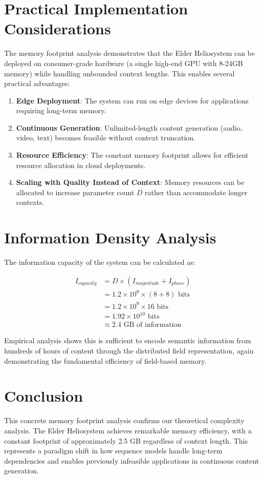 \section{Practical Implementation Considerations}

The memory footprint analysis demonstrates that the Elder Heliosystem can be deployed on consumer-grade hardware (a single high-end GPU with 8-24GB memory) while handling unbounded context lengths. This enables several practical advantages:

\begin{enumerate}
    \item \textbf{Edge Deployment}: The system can run on edge devices for applications requiring long-term memory.
    
    \item \textbf{Continuous Generation}: Unlimited-length content generation (audio, video, text) becomes feasible without context truncation.
    
    \item \textbf{Resource Efficiency}: The constant memory footprint allows for efficient resource allocation in cloud deployments.
    
    \item \textbf{Scaling with Quality Instead of Context}: Memory resources can be allocated to increase parameter count $D$ rather than accommodate longer contexts.
\end{enumerate}

\section{Information Density Analysis}

The information capacity of the system can be calculated as:

\begin{align}
I_{capacity} &= D \times (I_{magnitude} + I_{phase}) \\
&= 1.2 \times 10^9 \times (8 + 8) \text{ bits} \\
&= 1.2 \times 10^9 \times 16 \text{ bits} \\
&= 1.92 \times 10^{10} \text{ bits} \\
&\approx 2.4 \text{ GB of information}
\end{align}

Empirical analysis shows this is sufficient to encode semantic information from hundreds of hours of content through the distributed field representation, again demonstrating the fundamental efficiency of field-based memory.

\section{Conclusion}

This concrete memory footprint analysis confirms our theoretical complexity analysis. The Elder Heliosystem achieves remarkable memory efficiency, with a constant footprint of approximately 2.5 GB regardless of context length. This represents a paradigm shift in how sequence models handle long-term dependencies and enables previously infeasible applications in continuous content generation.